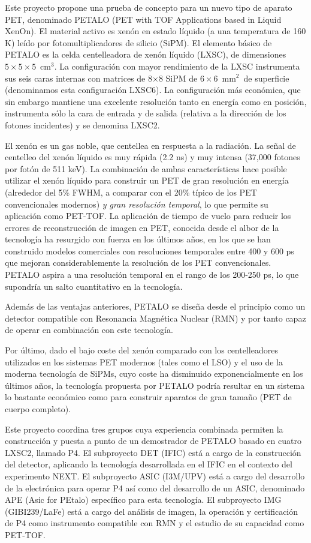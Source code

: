 Este proyecto propone una prueba de concepto para un nuevo tipo de aparato PET, denominado PETALO (PET with TOF Applications based in Liquid XenOn). El material activo es xenón en estado líquido (a una temperatura de 160 K) leído por fotomultiplicadores de silicio (SiPM). El elemento básico de PETALO es la celda centelleadora de xenón líquido (LXSC), de dimensiones $5\times 5 \times 5$~cm$^3$. La configuración con mayor rendimiento de la LXSC instrumenta sus seis caras internas con matrices de 8$\times$8 SiPM de $6 \times 6$~mm$^2$~de superficie (denominamos esta configuración LXSC6). La configuración más económica, que sin embargo mantiene una excelente resolución tanto en energía como en posición, instrumenta sólo la cara de entrada y de salida (relativa a la dirección de los fotones incidentes) y se denomina LXSC2.

El xenón es un gas noble, que centellea en respuesta a la radiación. La señal de centelleo del xenón líquido es muy rápida (2.2 ns) y muy intensa (37,000 fotones por fotón de 511 keV). La combinación de ambas características hace posible utilizar el xenón líquido para construir un PET de gran resolución en energía (alrededor del 5\% FWHM, a comparar con el 20\% típico de los PET convencionales modernos) {\em y gran resolución temporal}, lo que permite su aplicación como PET-TOF. La aplicación de tiempo de vuelo para reducir los errores de reconstrucción de imagen en PET, conocida desde el albor de la tecnología ha resurgido con fuerza en los últimos años, en los que se han construido modelos comerciales con resoluciones temporales entre 400 y 600 ps que mejoran considerablemente la resolución de los PET convencionales. PETALO aspira a una resolución temporal en el rango de los 200-250 ps, lo que supondría un salto cuantitativo en la tecnología.

Además de las ventajas anteriores, PETALO se diseña desde el principio como un detector compatible con Resonancia Magnética Nuclear (RMN) y por tanto capaz de operar en combinación con este tecnología.

Por último, dado el bajo coste del xenón comparado con los centelleadores utilizados en los sistemas PET modernos (tales como el LSO) y el uso de la moderna tecnología de SiPMs, cuyo coste ha disminuido exponencialmente en los últimos años, la tecnología propuesta por PETALO podría resultar en un sistema lo bastante económico como para construir aparatos de gran tamaño (PET de cuerpo completo). 

Este proyecto coordina tres grupos cuya experiencia combinada permiten la construcción y puesta a punto de un demostrador de PETALO basado en cuatro LXSC2, llamado P4. El subproyecto DET (IFIC) está a cargo de la construcción del detector, aplicando la tecnología desarrollada en el IFIC en el contexto del experimento NEXT. El subproyecto ASIC (I3M/UPV) está a cargo del desarrollo de la electrónica para operar P4 así como del desarrollo de un ASIC, denominado APE (Asic for PEtalo) específico para esta tecnología. El subproyecto IMG (GIBI239/LaFe) está a cargo del análisis de imagen, la operación y certificación de P4 como instrumento compatible con RMN y el estudio de su capacidad como PET-TOF. 



